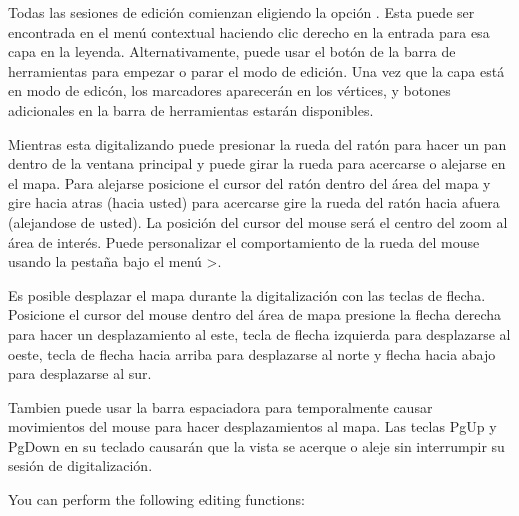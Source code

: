 Todas las sesiones de edici\'on comienzan eligiendo la opci\'on .
Esta puede ser encontrada en el men\'u contextual haciendo clic derecho en la entrada para esa capa en la leyenda.
Alternativamente, puede usar el bot\'on 
 de la barra de herramientas para empezar o parar 
el modo de edici\'on. Una vez que la capa est\'a en modo de edic\'on, 
los marcadores aparecer\'an en los v\'ertices, y botones adicionales en la barra de herramientas 
estar\'an disponibles.


Mientras esta digitalizando puede presionar la rueda del rat\'on para hacer un pan dentro de la ventana
principal y puede girar la rueda para acercarse o alejarse en el mapa. Para alejarse
posicione el cursor del rat\'on dentro del \'area del mapa y gire hacia atras (hacia usted) 
para acercarse gire la rueda del rat\'on hacia afuera (alejandose de usted). La posici\'on del cursor del mouse ser\'a el centro 
del zoom al \'area de inter\'es. Puede personalizar el comportamiento 
de la rueda del mouse usando la pesta\~na  bajo el men\'u
 >.  


Es posible desplazar el mapa  durante la digitalizaci\'on con las teclas de flecha. Posicione
el cursor del mouse dentro del \'area de mapa presione la flecha derecha para hacer un
desplazamiento al este, tecla de flecha izquierda para desplazarse al oeste, tecla de flecha hacia arriba para desplazarse al norte y flecha hacia abajo 
para desplazarse al sur.

Tambien puede usar la barra espaciadora para temporalmente causar movimientos del mouse para hacer desplazamientos 
al mapa. Las teclas PgUp y PgDown en su teclado causar\'an que la vista se acerque 
o aleje sin interrumpir su sesi\'on de digitalizaci\'on.

You can perform the following editing functions:

